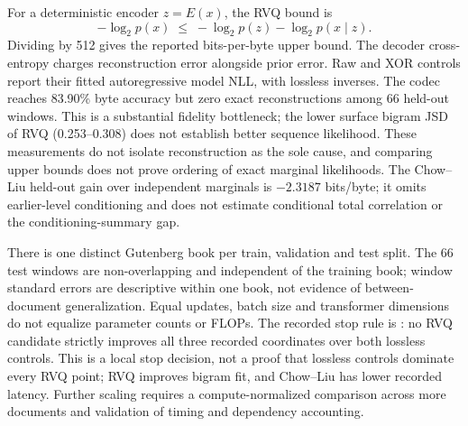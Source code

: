 For a deterministic encoder $z=E(x)$, the RVQ bound is
\[
-\log_2 p(x)\;\leq\;-\log_2 p(z)-\log_2 p(x\mid z).
\]
Dividing by 512 gives the reported bits-per-byte upper bound. The decoder
cross-entropy charges reconstruction error alongside prior error. Raw and XOR
controls report their fitted autoregressive model NLL, with lossless inverses.
The codec reaches 83.90\% byte accuracy but zero exact reconstructions among
66 held-out windows. This is a substantial fidelity bottleneck; the lower
surface bigram JSD of RVQ (0.253--0.308) does not establish better sequence
likelihood. These measurements do not isolate reconstruction as the sole
cause, and comparing upper bounds does not prove ordering of exact marginal
likelihoods. The Chow--Liu held-out gain over independent marginals is
$-2.3187$ bits/byte; it omits earlier-level conditioning and does not estimate
conditional total correlation or the conditioning-summary gap.

There is one distinct Gutenberg book per train, validation and test split.
The 66 test windows are non-overlapping and independent of the training book;
window standard errors are descriptive within one book, not evidence of
between-document generalization. Equal updates, batch size and transformer
dimensions do not equalize parameter counts or FLOPs. The recorded stop rule is
: no RVQ candidate strictly improves
all three recorded coordinates over both lossless controls. This is a local
stop decision, not a proof that lossless controls dominate every RVQ point;
RVQ improves bigram fit, and Chow--Liu has lower recorded latency. Further
scaling requires a compute-normalized comparison across more documents and
validation of timing and dependency accounting.
